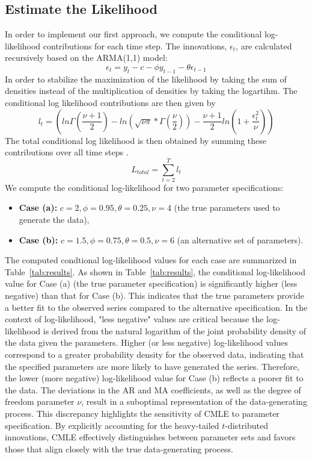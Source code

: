 \documentclass[a4paper,12pt]{article}
\begin{document}
 \subsection{Estimate the Likelihood}
In order to implement our first approach, we compute the conditional log-likelihood contributions for each time step. 
The innovations, $\epsilon_t$, are calculated recursively based on the ARMA(1,1) model:
\begin{equation}
    \epsilon_t = y_t - c -\phi y_{t-1} - \theta \epsilon_{t-1}
\end{equation}
In order to stabilize the maximization of the likelihood by taking the sum of densities instead of the multiplication of densities by taking the logartihm.
The conditional log likelihood contributions are then given by
 \begin{equation}
      l_{t} =  (ln \Gamma(\frac{\nu +1}{2})- ln(\sqrt{\nu \pi} * \Gamma(\frac{\nu}{2})) - \frac{\nu+1}{2}ln(1+\frac{\epsilon_t^{2}}{\nu}))
 \end{equation}
The total conditional log likelihood is then obtained by summing these contributions over all time steps .
\begin{equation}
    L_{total} = \sum_{t=2}^{T} l_t
\end{equation}
We compute the conditional log-likelihood for two parameter specifications:
\begin{itemize}
    \item \textbf{Case (a):} $c = 2, \phi = 0.95, \theta = 0.25, \nu = 4$ (the true parameters used to generate the data),
    \item \textbf{Case (b):} $c = 1.5, \phi = 0.75, \theta = 0.5, \nu = 6$ (an alternative set of parameters).
\end{itemize}
The computed condtional log-likelihood values for each case are summarized in Table~\ref{tab:results}.
As shown in Table~\ref{tab:results}, the conditional log-likelihood value for Case (a) (the true parameter specification) is significantly higher (less negative) than that for Case (b). This indicates that the true parameters provide a better fit to the observed series compared to the alternative specification.
In the context of log-likelihood, "less negative" values are critical because the log-likelihood is derived from the natural logarithm of the joint probability density of the data given the parameters. Higher (or less negative) log-likelihood values correspond to a greater probability density for the observed data, indicating that the specified parameters are more likely to have generated the series.
Therefore, the lower (more negative) log-likelihood value for Case (b) reflects a poorer fit to the data.
The deviations in the AR and MA coefficients, as well as the degree of freedom parameter $\nu$, result in a suboptimal representation of the data-generating process. 
This discrepancy highlights the sensitivity of CMLE to parameter specification. By explicitly accounting for the heavy-tailed $t$-distributed innovations, CMLE effectively distinguishes between parameter sets and favors those that align closely with the true data-generating process.
\end{document}
